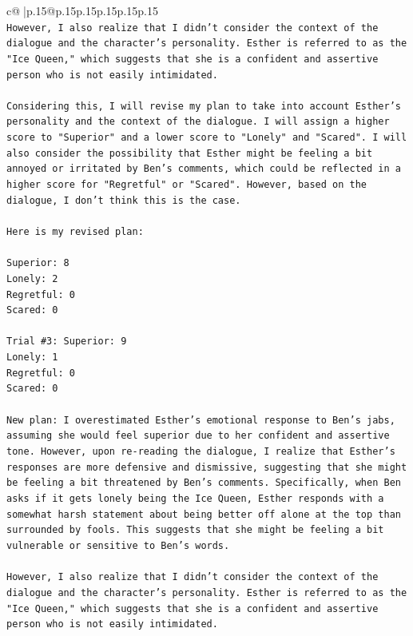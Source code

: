 \documentclass{article}
\begin{document}
{\begin{supertabular}{c@{$\;$}|p{.15\linewidth}@{}p{.15\linewidth}p{.15\linewidth}p{.15\linewidth}p{.15\linewidth}p{.15\linewidth}}
{{{\\ 
\texttt{However, I also realize that I didn't consider the context of the dialogue and the character's personality. Esther is referred to as the "Ice Queen," which suggests that she is a confident and assertive person who is not easily intimidated. } \\
\\ 
\texttt{Considering this, I will revise my plan to take into account Esther's personality and the context of the dialogue. I will assign a higher score to "Superior" and a lower score to "Lonely" and "Scared". I will also consider the possibility that Esther might be feeling a bit annoyed or irritated by Ben's comments, which could be reflected in a higher score for "Regretful" or "Scared". However, based on the dialogue, I don't think this is the case.} \\
\\ 
\texttt{Here is my revised plan:} \\
\\ 
\texttt{Superior: 8} \\
\texttt{Lonely: 2} \\
\texttt{Regretful: 0} \\
\texttt{Scared: 0} \\
\\ 
\texttt{Trial \#3: Superior: 9} \\
\texttt{Lonely: 1} \\
\texttt{Regretful: 0} \\
\texttt{Scared: 0} \\
\\ 
\texttt{New plan: I overestimated Esther's emotional response to Ben's jabs, assuming she would feel superior due to her confident and assertive tone. However, upon re{-}reading the dialogue, I realize that Esther's responses are more defensive and dismissive, suggesting that she might be feeling a bit threatened by Ben's comments. Specifically, when Ben asks if it gets lonely being the Ice Queen, Esther responds with a somewhat harsh statement about being better off alone at the top than surrounded by fools. This suggests that she might be feeling a bit vulnerable or sensitive to Ben's words.} \\
\\ 
\texttt{However, I also realize that I didn't consider the context of the dialogue and the character's personality. Esther is referred to as the "Ice Queen," which suggests that she is a confident and assertive person who is not easily intimidated.} \\
}}}
\end{supertabular}}
\end{document}
